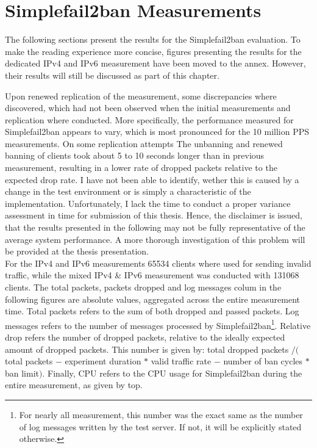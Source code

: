 \pagebreak

\section{Simplefail2ban Measurements}

The following sections present the results for the Simplefail2ban evaluation. To make the reading experience more concise, figures presenting the results 
for the dedicated \ac{IPv4} and \ac{IPv6} measurement have been moved to the annex. However, their results will still be discussed as part of this chapter.

Upon renewed replication of the measurement, some discrepancies where discovered, which had not been observed when the initial measurements and replication where conducted.
More specifically, the performance measured for Simplefail2ban appears to vary, which is most pronounced for the 10 million \ac{PPS} measurements. On some replication attempts
The unbanning and renewed banning of clients took about 5 to 10 seconds longer than in previous measurement, resulting in a lower rate of dropped packets relative to the expected drop rate.
I have not been able to identify, wether this is caused by a change in the test environment or is simply a characteristic of the implementation. Unfortunately, I lack the time
to conduct a proper variance assessment in time for submission of this thesis. Hence, the disclaimer is issued, that the results presented in the following may not be fully
representative of the average system performance. A more thorough investigation of this problem will be provided at the thesis presentation. \\ 

For the \ac{IPv4} and \ac{IPv6} measurements 65534 clients where used for sending invalid traffic,
while the mixed \ac{IPv4} \& \ac{IPv6} measurement was conducted with 131068 clients. The total packets, packets dropped and
log messages colum in the following figures are absolute values, aggregated across the entire measurement time. Total packets refers to the sum of both dropped and passed packets. Log messages refers to the number of messages processed by Simplefail2ban\footnote{For nearly all measurement, this number was the exact same as the number of log messages written by the test server. If not, it will be explicitly stated otherwise.}.
Relative drop refers the number of dropped packets, relative to the ideally expected amount of dropped packets. This number is given by: total dropped packets $/ ($total packets $-$ experiment duration $*$ valid traffic rate $-$ number of ban cycles $*$ ban limit$)$. Finally, \ac{CPU} refers to the \ac{CPU} usage for Simplefail2ban
during the entire measurement, as given by top. 

